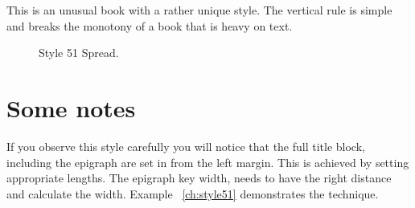 \noindent This is an unusual book with a rather unique style. The vertical rule is simple and breaks the monotony of a book that is heavy on text.
\begin{figure}[ht]
\caption{Style 51 Spread.}
\end{figure}

\section{Some notes}

If you observe this style carefully you will notice that the full title block, including the epigraph are set in from the left margin. This is achieved by setting appropriate  lengths. The epigraph key width, needs to have the right distance and calculate the width. Example~ \ref{ch:style51} demonstrates the technique.

